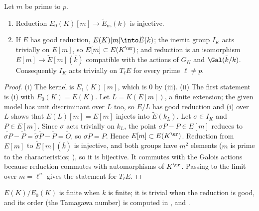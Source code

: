 \begin{corollary}\label{cor:reduction:torsion-injects}
Let $m$ be prime to $p$.
\begin{enumerate}[label=(\roman*)]
\item Reduction $E_0(K)[m]\to\tilde E_{\mathrm{ns}}(k)$ is injective.
\item If $E$ has good reduction, $E(K)[m]\into\tilde E(k)$; the inertia group $I_K$ acts trivially on $E[m]$, so
$E[m]\subset E(K^{\ur})$; and reduction is an isomorphism $E[m]\to\tilde E[m](\bar k)$ compatible with the actions
of $G_K$ and $\Gal(\bar k/k)$. Consequently $I_K$ acts trivially on $T_\ell E$ for every prime $\ell\ne p$.
\end{enumerate}
\end{corollary}

\begin{proof}
(i) The kernel is $E_1(K)[m]$, which is $0$ by (iii).
(ii) The first statement is (i) with $E_0(K)=E(K)$. Let $L=K(E[m])$, a finite extension; the given model has unit
discriminant over $L$ too, so $E/L$ has good reduction and (i) over $L$ shows that $E(L)[m]=E[m]$ injects into
$\tilde E(k_L)$. Let $\sigma\in I_K$ and $P\in E[m]$. Since $\sigma$ acts trivially on $k_L$, the point $\sigma P-P\in E[m]$
reduces to $\widetilde{\sigma P}-\tilde P=\tilde\sigma\tilde P-\tilde P=\tilde O$, so $\sigma P=P$. Hence $E[m]\subset E(K^{\ur})$.
Reduction from $E[m]$ to $\tilde E[m](\bar k)$ is injective, and both groups have $m^2$ elements ($m$ is prime to the
characteristics; ), so it is bijective. It commutes with the Galois actions because reduction
commutes with automorphisms of $K^{\ur}$. Passing to the limit over $m=\ell^n$ gives the statement for $T_\ell E$.
\end{proof}

\begin{proposition}\label{prop:reduction:index-finite}
$E(K)/E_0(K)$ is finite when $k$ is finite; it is trivial when the reduction is good, and its order (the Tamagawa
number) is computed in ,  and
.
\end{proposition}

